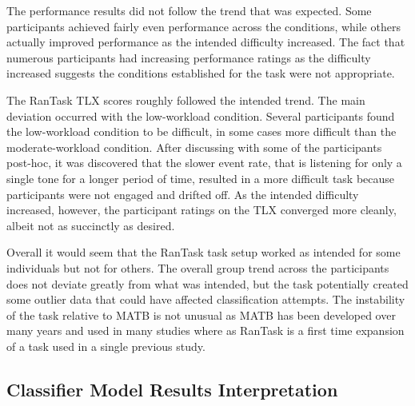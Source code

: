 \documentclass[11pt]{article}
\begin{document}
	The performance results did not follow the trend that was expected. Some participants achieved fairly even performance across the conditions, while others actually improved performance as the intended difficulty increased. The fact that numerous participants had increasing performance ratings as the difficulty increased suggests the conditions established for the task were not appropriate. 
		
	The RanTask TLX scores roughly followed the intended trend. The main deviation occurred with the low-workload condition. Several participants found the low-workload condition to be difficult, in some cases more difficult than the moderate-workload condition. After discussing with some of the participants post-hoc, it was discovered that the slower event rate, that is listening for only a single tone for a longer period of time, resulted in a more difficult task because participants were not engaged and drifted off.  As the intended difficulty increased, however, the participant ratings on the TLX converged more cleanly, albeit not as succinctly as desired.

	Overall it would seem that the RanTask task setup worked as intended for some individuals but not for others. The overall group trend across the participants does not deviate greatly from what was intended, but the task potentially created some outlier data that could have affected classification attempts. The instability of the task relative to MATB is not unusual as MATB has been developed over many years and used in many studies where as RanTask is a first time expansion of a task used in a single previous study. 

	\subsection{Classifier Model Results Interpretation}
	
\end{document}
